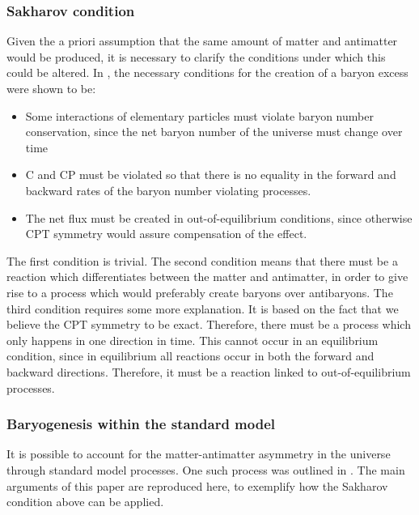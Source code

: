 \subsubsection{Sakharov condition}\label{sec:IntroSakharovContidion}
Given the a priori assumption that the same amount of matter and antimatter would be produced, it is necessary to clarify the conditions under which this could be altered. In \cite{Sakharov:1967dj}, the necessary conditions for the creation of a baryon excess were shown to be:
\begin{itemize}
    \item Some interactions of elementary particles must violate baryon number conservation, since the net baryon number of the universe must change over time
    \item C and CP must be violated so that there is no equality in the forward and backward rates of the baryon number violating processes. 
    \item The net flux must be created in out-of-equilibrium conditions, since otherwise CPT symmetry would assure compensation of the effect. 
\end{itemize}

The first condition is trivial. The second condition means that there must be a reaction which differentiates between the matter and antimatter, in order to give rise to a process which would preferably create baryons over antibaryons. The third condition requires some more explanation. It is based on the fact that we believe the CPT symmetry to be exact. Therefore, there must be a process which only happens in one direction in time. This cannot occur in an equilibrium condition, since in equilibrium all reactions occur in both the forward and backward directions. Therefore, it must be a reaction linked to out-of-equilibrium processes. 


\subsubsection{Baryogenesis within the standard model}\label{sec:IntroBaryogenesisSM}
It is possible to account for the matter-antimatter asymmetry in the universe through standard model processes. One such process was outlined in \cite{Bubbles_asymmetry}. The main arguments of this paper are reproduced here, to exemplify how the Sakharov condition above can be applied. \\

